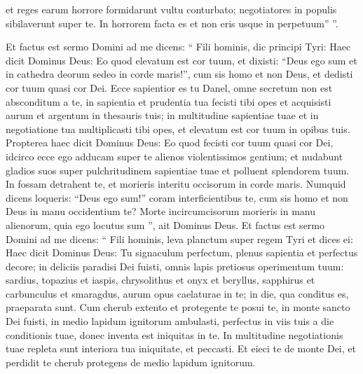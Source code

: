 \begin{biblechapter}
\begin{biblechapter}
\begin{biblechapter}
\begin{biblechapter}
\begin{biblechapter}
\begin{biblechapter}
\begin{biblechapter}
\begin{biblechapter}
\begin{biblechapter}
\begin{biblechapter}
\begin{biblechapter}
\begin{biblechapter}
\begin{biblechapter}
\begin{biblechapter}
\begin{biblechapter}
\begin{biblechapter}
\begin{biblechapter}
\begin{biblechapter}
\begin{biblechapter}
\begin{biblechapter}
\begin{biblechapter}
\begin{biblechapter}
\begin{biblechapter}
\begin{biblechapter}
\begin{biblechapter}
\begin{biblechapter}
\begin{biblechapter}
 et reges earum horrore formidarunt vultu conturbato;
 \verse negotiatores in populis sibilaverunt super te.
 In horrorem facta es
 et non eris usque in perpetuum” ”. 
\begin{biblechapter}
\verse Et factus est sermo Domini ad me dicens: 
\verse “ Fili hominis, dic principi Tyri: Haec dicit Dominus Deus:
 Eo quod elevatum est cor tuum,
 et dixisti: “Deus ego sum
 et in cathedra deorum sedeo
 in corde maris!”,
 cum sis homo et non Deus,
 et dedisti cor tuum quasi cor Dei.
 \verse Ecce sapientior es tu Danel,
 omne secretum non est absconditum a te,
 \verse in sapientia et prudentia tua
 fecisti tibi opes
 et acquisisti aurum et argentum
 in thesauris tuis;
 \verse in multitudine sapientiae tuae et in negotiatione tua
 multiplicasti tibi opes,
 et elevatum est cor tuum in opibus tuis.
 \verse Propterea haec dicit Dominus Deus: Eo quod fecisti cor tuum quasi cor Dei,
 \verse idcirco ecce ego adducam super te
 alienos violentissimos gentium;
 et nudabunt gladios suos super pulchritudinem sapientiae tuae
 et polluent splendorem tuum.
 \verse In fossam detrahent te, et morieris
 interitu occisorum in corde maris.
 \verse Numquid dicens loqueris: “Deus ego sum!”
 coram interficientibus te,
 cum sis homo et non Deus
 in manu occidentium te?
 \verse Morte incircumcisorum morieris
 in manu alienorum,
 quia ego locutus sum ”,
 ait Dominus Deus.
 \verse Et factus est sermo Domini ad me dicens: “ Fili hominis, leva planctum super regem Tyri 
\verse et dices ei: Haec dicit Dominus Deus:
 Tu signaculum perfectum,
 plenus sapientia et perfectus decore;
 \verse in deliciis paradisi Dei fuisti,
 omnis lapis pretiosus operimentum tuum:
 sardius, topazius et iaspis,
 chrysolithus et onyx et beryllus,
 sapphirus et carbunculus et smaragdus,
 aurum opus caelaturae in te;
 in die, qua conditus es, praeparata sunt.
 \verse Cum cherub extento et protegente te posui te,
 in monte sancto Dei fuisti,
 in medio lapidum ignitorum ambulasti,
 \verse perfectus in viis tuis
 a die conditionis tuae,
 donec inventa est iniquitas in te.
 \verse In multitudine negotiationis tuae repleta sunt interiora tua
 iniquitate, et peccasti.
 Et eieci te de monte Dei,
 et perdidit te cherub protegens
 de medio lapidum ignitorum.

\end{biblechapter}
\end{biblechapter}
\end{biblechapter}
\end{biblechapter}
\end{biblechapter}
\end{biblechapter}
\end{biblechapter}
\end{biblechapter}
\end{biblechapter}
\end{biblechapter}
\end{biblechapter}
\end{biblechapter}
\end{biblechapter}
\end{biblechapter}
\end{biblechapter}
\end{biblechapter}
\end{biblechapter}
\end{biblechapter}
\end{biblechapter}
\end{biblechapter}
\end{biblechapter}
\end{biblechapter}
\end{biblechapter}
\end{biblechapter}
\end{biblechapter}
\end{biblechapter}
\end{biblechapter}
\end{biblechapter}
